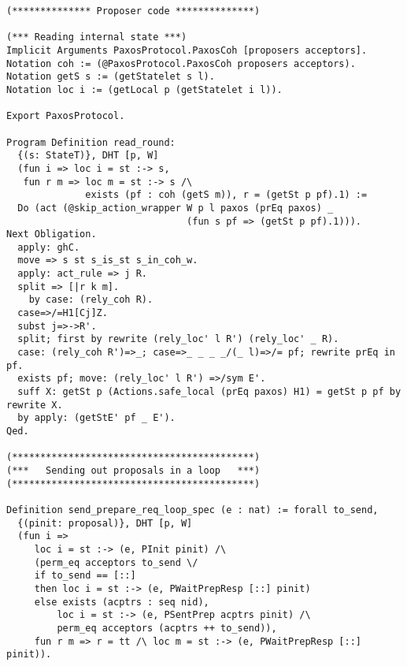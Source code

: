\begin{landscape}
\begin{multicols*}{2}
\begin{lstlisting}[style=SourceCodeListing]
(************** Proposer code **************)

(*** Reading internal state ***)
Implicit Arguments PaxosProtocol.PaxosCoh [proposers acceptors].
Notation coh := (@PaxosProtocol.PaxosCoh proposers acceptors).
Notation getS s := (getStatelet s l).
Notation loc i := (getLocal p (getStatelet i l)).

Export PaxosProtocol.

Program Definition read_round:
  {(s: StateT)}, DHT [p, W]
  (fun i => loc i = st :-> s,
   fun r m => loc m = st :-> s /\
              exists (pf : coh (getS m)), r = (getSt p pf).1) :=
  Do (act (@skip_action_wrapper W p l paxos (prEq paxos) _
                                (fun s pf => (getSt p pf).1))).
Next Obligation.
  apply: ghC.
  move => s st s_is_st s_in_coh_w.
  apply: act_rule => j R.
  split => [|r k m].
    by case: (rely_coh R).
  case=>/=H1[Cj]Z.
  subst j=>->R'.
  split; first by rewrite (rely_loc' l R') (rely_loc' _ R).
  case: (rely_coh R')=>_; case=>_ _ _ _/(_ l)=>/= pf; rewrite prEq in pf.
  exists pf; move: (rely_loc' l R') =>/sym E'.
  suff X: getSt p (Actions.safe_local (prEq paxos) H1) = getSt p pf by rewrite X.
  by apply: (getStE' pf _ E').
Qed.

(*******************************************)
(***   Sending out proposals in a loop   ***)
(*******************************************)

Definition send_prepare_req_loop_spec (e : nat) := forall to_send,
  {(pinit: proposal)}, DHT [p, W]
  (fun i =>
     loc i = st :-> (e, PInit pinit) /\
     (perm_eq acceptors to_send \/
     if to_send == [::]
     then loc i = st :-> (e, PWaitPrepResp [::] pinit)
     else exists (acptrs : seq nid),
         loc i = st :-> (e, PSentPrep acptrs pinit) /\
         perm_eq acceptors (acptrs ++ to_send)),
     fun r m => r = tt /\ loc m = st :-> (e, PWaitPrepResp [::] pinit)).


\end{lstlisting}
\end{multicols*}
\end{landscape}
